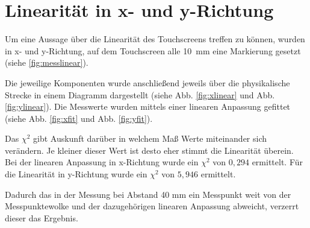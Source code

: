 \section{Linearität in x- und y-Richtung}
\label{ab:linear}
Um eine Aussage über die Linearität des Touchscreens treffen zu können, wurden in x- und y-Richtung, auf dem Touchscreen alle \SI{10}{mm} eine Markierung gesetzt (siehe \cref{fig:messlinear}).

Die jeweilige Komponenten wurde anschließend jeweils über die physikalische Strecke in einem Diagramm dargestellt (siehe Abb. \cref{fig:xlinear} und Abb. \cref{fig:ylinear}).
Die Messwerte wurden mittels einer linearen Anpassung gefittet (siehe Abb. \cref{fig:xfit} und Abb. \cref{fig:yfit}).

Das \(\chi^2\) gibt Auskunft darüber in welchem Maß Werte miteinander sich verändern.
Je kleiner dieser Wert ist desto eher stimmt die Linearität überein.
Bei der linearen Anpassung in x-Richtung wurde ein \(\chi^2\) von \(0,294\) ermittelt.
Für die Linearität in y-Richtung wurde ein \(\chi^2\) von \(5,946\) ermittelt.

Dadurch das in der Messung bei Abstand 40 mm ein Messpunkt weit von der Messpunktewolke und der dazugehörigen linearen Anpassung abweicht, verzerrt dieser das Ergebnis.


